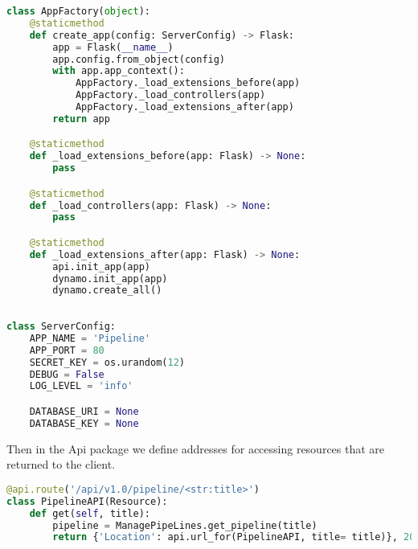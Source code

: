\begin{lstlisting}[language=Python]
class AppFactory(object):
    @staticmethod
    def create_app(config: ServerConfig) -> Flask:
        app = Flask(__name__)
        app.config.from_object(config)
        with app.app_context():
            AppFactory._load_extensions_before(app)
            AppFactory._load_controllers(app)
            AppFactory._load_extensions_after(app)
        return app

    @staticmethod
    def _load_extensions_before(app: Flask) -> None:
        pass

    @staticmethod
    def _load_controllers(app: Flask) -> None:
        pass

    @staticmethod
    def _load_extensions_after(app: Flask) -> None:
        api.init_app(app)
        dynamo.init_app(app)
        dynamo.create_all()
        
        
class ServerConfig:
    APP_NAME = 'Pipeline'
    APP_PORT = 80
    SECRET_KEY = os.urandom(12)
    DEBUG = False
    LOG_LEVEL = 'info'

    DATABASE_URI = None
    DATABASE_KEY = None
\end{lstlisting}

Then in the Api package we define addresses for accessing resources that are returned to the client.

\begin{lstlisting}[language=Python]
@api.route('/api/v1.0/pipeline/<str:title>')
class PipelineAPI(Resource):
    def get(self, title):
        pipeline = ManagePipeLines.get_pipeline(title)
        return {'Location': api.url_for(PipelineAPI, title= title)}, 201
\end{lstlisting}
